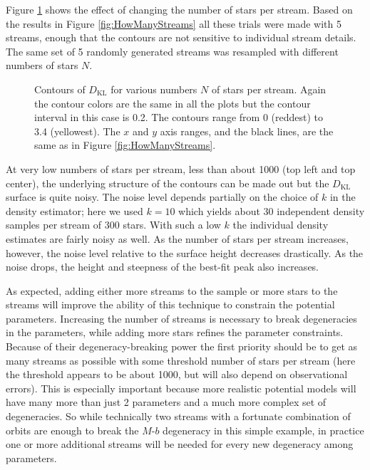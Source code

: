 \documentclass{emulateapj}
\newcommand{\sub}[2]{\ensuremath{#1_{\mathrm{#2}}}}
\begin{document}
Figure \ref{fig:HowManyStars} shows the effect of changing the number of stars per stream. Based on the results in Figure \ref{fig:HowManyStreams} all these trials were made with 5 streams, enough that the contours are not sensitive to individual stream details. The same set of 5 randomly generated streams was resampled with different numbers of stars $N$.

\begin{figure}
\caption{Contours of $\sub{D}{KL}$ for various numbers $N$ of stars per stream. Again the contour colors are the same in all the plots but the contour interval in this case is 0.2. The contours range from 0 (reddest) to 3.4 (yellowest). The $x$ and $y$ axis ranges, and the black lines, are the same as in Figure \ref{fig:HowManyStreams}.}
\label{fig:HowManyStars}
\end{figure}

At very low numbers of stars per stream, less than about 1000 (top left and top center), the underlying structure of the contours can be made out but the $\sub{D}{KL}$ surface is quite noisy. The noise level depends partially on the choice of $k$ in the density estimator; here we used $k=10$ which yields about 30 independent density samples per stream of 300 stars. With such a low $k$ the individual density estimates are fairly noisy as well. As the number of stars per stream increases, however, the noise level relative to the surface height decreases drastically. As the noise drops, the height and steepness of the best-fit peak also increases.

As expected, adding either more streams to the sample or more stars to the streams will improve the ability of this technique to constrain the potential parameters. Increasing the number of streams is necessary to break degeneracies in the parameters, while adding more stars refines the parameter constraints. Because of their degeneracy-breaking power the first priority should be to get as many streams as possible with some threshold number of stars per stream (here the threshold appears to be about 1000, but will also depend on observational errors). This is especially important because more realistic potential models will have many more than just 2 parameters and a much more complex set of degeneracies. So while technically two streams with a fortunate combination of orbits are enough to break the $M$-$b$ degeneracy in this simple example, in practice one or more additional streams will be needed for every new degeneracy among parameters.
\end{document}
